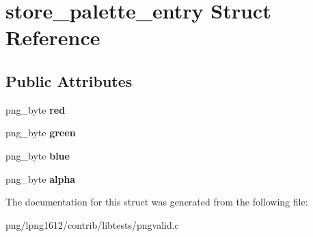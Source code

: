 \hypertarget{structstore__palette__entry}{\section{store\+\_\+palette\+\_\+entry Struct Reference}
\label{structstore__palette__entry}
}
\subsection*{Public Attributes}
\begin{DoxyCompactItemize}
\item 
\hypertarget{structstore__palette__entry_a0455f2ef4184cfadde32a606b84900d4}{png\+\_\+byte {\bfseries red}}\label{structstore__palette__entry_a0455f2ef4184cfadde32a606b84900d4}

\item 
\hypertarget{structstore__palette__entry_a69bce1373b258e931055426438082aac}{png\+\_\+byte {\bfseries green}}\label{structstore__palette__entry_a69bce1373b258e931055426438082aac}

\item 
\hypertarget{structstore__palette__entry_a4473578e5406b925a678c34b725b7274}{png\+\_\+byte {\bfseries blue}}\label{structstore__palette__entry_a4473578e5406b925a678c34b725b7274}

\item 
\hypertarget{structstore__palette__entry_a5cadf777631cb4e0b4258e441107e110}{png\+\_\+byte {\bfseries alpha}}\label{structstore__palette__entry_a5cadf777631cb4e0b4258e441107e110}

\end{DoxyCompactItemize}


The documentation for this struct was generated from the following file\+:\begin{DoxyCompactItemize}
\item 
png/lpng1612/contrib/libtests/pngvalid.\+c\end{DoxyCompactItemize}
